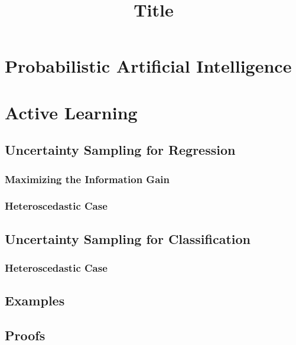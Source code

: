 \documentclass[
  fourColumns,
  landscape,
]{formularyETH/formularyETH}
\title{Title}
\begin{document}
\section*{Probabilistic Artificial Intelligence}\label{sec:probabilistic_artificial_intelligence}
  \section{Active Learning}\label{sec:active_learning}
    
    \subsection{Uncertainty Sampling for Regression}\label{subsec:uncertainty_sampling_for_regression}
      \subsubsection{Maximizing the Information Gain}\label{subsubsec:maximizing_the_information_gain}
      
      \subsubsection{Heteroscedastic Case}\label{subsubsec:heteroscedastic_case}
      
    \subsection{Uncertainty Sampling for Classification}\label{subsec:uncertainty_sampling_for_classification}
      
      \subsubsection{Heteroscedastic Case}\label{subsubsec:heteroscedastic_case}
      
        \label{subsubsubsec:informative_sampling_for_classification}
        
    \subsection{Examples}\label{subsec:examples}
    
    \subsection{Proofs}\label{subsec:proofs}
    
\newpage
\end{document}

